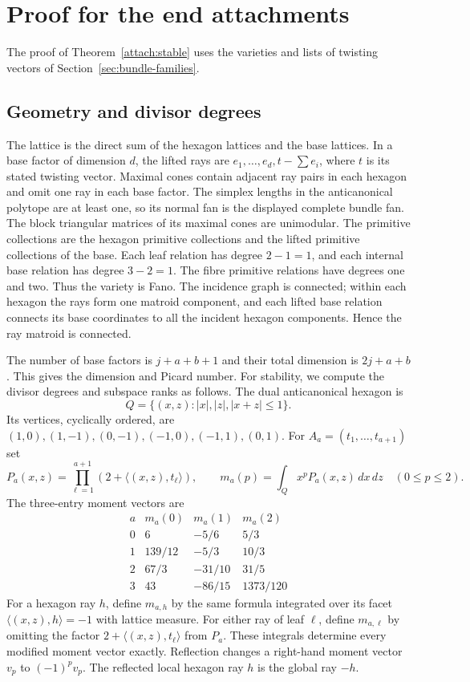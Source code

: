 \section{Proof for the end attachments}\label{sec:attachments}

The proof of Theorem~\ref{attach:stable} uses the varieties and lists of twisting vectors
of Section~\ref{sec:bundle-families}.

\subsection{Geometry and divisor degrees}
The lattice is the direct sum of the hexagon lattices and the base
lattices. In a base factor of dimension $d$, the lifted rays are
$e_1,\ldots,e_d,t-\sum e_i$, where $t$ is its stated twisting vector.
Maximal cones contain adjacent ray pairs in each hexagon and omit one
ray in each base factor. The simplex lengths in the anticanonical polytope
are at least one, so its normal fan is the displayed complete bundle fan.
The block triangular matrices of its maximal cones are unimodular.
The primitive collections are the hexagon primitive collections and the lifted
primitive collections of the base. Each leaf relation has degree
$2-1=1$, and each internal base relation has degree $3-2=1$.
The fibre primitive relations have degrees one and two. Thus the
variety is Fano. The incidence graph is connected; within each hexagon
the rays form one matroid component, and each lifted base relation
connects its base coordinates to all the incident hexagon components.
Hence the ray matroid is connected.

The number of base factors is $j+a+b+1$ and their total dimension is
$2j+a+b$. This gives the dimension and Picard number. For stability, we
compute the divisor degrees and subspace ranks as follows.
\medskip
The dual anticanonical hexagon is
\[
 Q=\{(x,z): |x|,|z|,|x+z|\le1\}.
\]
Its vertices, cyclically ordered, are
$(1,0),(1,-1),(0,-1),(-1,0),(-1,1),(0,1)$.
For $A_a=(t_1,\ldots,t_{a+1})$ set
\[
 P_a(x,z)=\prod_{\ell=1}^{a+1}(2+\langle(x,z),t_\ell\rangle),
 \qquad
 m_a(p)=\int_Q x^pP_a(x,z)\,dx\,dz\quad(0\le p\le2).
\]
The three-entry moment vectors are
\[
\begin{array}{c|ccc}
 a&m_a(0)&m_a(1)&m_a(2)\\\hline
 0&6&-5/6&5/3\\
 1&139/12&-5/3&10/3\\
 2&67/3&-31/10&31/5\\
 3&43&-86/15&1373/120
\end{array}
\]
For a hexagon ray $h$, define $m_{a,h}$ by the same formula integrated
over its facet $\langle(x,z),h\rangle=-1$ with lattice measure.
For either ray of leaf $\ell$, define $m_{a,\ell}$ by omitting the
factor $2+\langle(x,z),t_\ell\rangle$ from $P_a$.
These integrals determine every modified moment vector exactly. Reflection
changes a right-hand moment vector $v_p$ to
$(-1)^pv_p$. The reflected local hexagon ray $h$ is the global ray $-h$.

